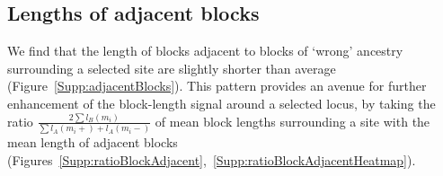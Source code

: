 \documentclass[12pt]{article}
\begin{document}
\subsection*{Lengths of adjacent blocks}
We find that the length of blocks adjacent to blocks of `wrong' ancestry surrounding a selected site are slightly shorter than average (Figure~\ref{Supp:adjacentBlocks}). This pattern provides an avenue for further enhancement of the block-length signal around a selected locus, by taking the ratio $\frac{2\sum{l_B(m_i)}}{\sum{l_A(m_i+)+l_A(m_i-)}}$ of mean block lengths surrounding a site with the mean length of adjacent blocks (Figures~\ref{Supp:ratioBlockAdjacent},~\ref{Supp:ratioBlockAdjacentHeatmap}).





\end{document}
